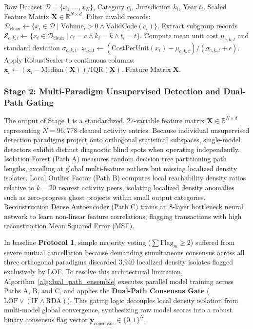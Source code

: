 \documentclass[runningheads]{llncs}
\begin{document}
\begin{algorithm}[htbp]
\caption{Year-Stratified Regional Baseline Centering and Scaling}
\label{alg:baseline_centering}
\begin{algorithmic}[1]
\REQUIRE Raw Dataset $\mathcal{D} = \{x_1, \dots, x_N\}$, Category $c_i$, Jurisdiction $k_i$, Year $t_i$.
\ENSURE Scaled Feature Matrix $\mathbf{X} \in \mathbb{R}^{N \times d}$.
\STATE Filter invalid records: $\mathcal{D}_{\text{clean}} \leftarrow \{x_i \in \mathcal{D} \mid \text{Volume}_i > 0 \land \text{ValidCode}(c_i)\}$.
    \STATE Extract subgroup records $\mathcal{S}_{c,k,t} \leftarrow \{x_i \in \mathcal{D}_{\text{clean}} \mid c_i = c \land k_i = k \land t_i = t\}$.
    \STATE Compute mean unit cost $\mu_{c,k,t}$ and standard deviation $\sigma_{c,k,t}$.
        \STATE $z_{i, \text{cat}} \leftarrow (\text{CostPerUnit}(x_i) - \mu_{c,k,t}) / (\sigma_{c,k,t} + \epsilon)$.
    \ENDFOR
\ENDFOR
\STATE Apply RobustScaler to continuous columns: $\mathbf{x}_i \leftarrow (\mathbf{x}_i - \text{Median}(\mathbf{X})) / \text{IQR}(\mathbf{X})$.
\RETURN Feature Matrix $\mathbf{X}$.
\end{algorithmic}
\end{algorithm}

\subsubsection{Stage 2: Multi-Paradigm Unsupervised Detection and Dual-Path Gating}
The output of Stage 1 is a standardized, 27-variable feature matrix $\mathbf{X} \in \mathbb{R}^{N \times d}$ representing $N=96,778$ cleaned activity entries. Because individual unsupervised detection paradigms project onto orthogonal statistical subspaces, single-model detectors exhibit distinct diagnostic blind spots when operating independently. Isolation Forest (Path A) measures random decision tree partitioning path lengths, excelling at global multi-feature outliers but missing localized density isolates. Local Outlier Factor (Path B) computes local reachability density ratios relative to $k=20$ nearest activity peers, isolating localized density anomalies such as zero-progress ghost projects within small output categories. Reconstruction Dense Autoencoder (Path C) trains an 8-layer bottleneck neural network to learn non-linear feature correlations, flagging transactions with high reconstruction Mean Squared Error (MSE).

In baseline \textbf{Protocol 1}, simple majority voting ($\sum \text{Flag}_m \ge 2$) suffered from severe mutual cancellation because demanding simultaneous consensus across all three orthogonal paradigms discarded 3,940 localized density isolates flagged exclusively by LOF. To resolve this architectural limitation, Algorithm~\ref{alg:dual_path_ensemble} executes parallel model training across Paths A, B, and C, and applies the \textbf{Dual-Path Consensus Gate} ($\text{LOF} \lor (\text{IF} \land \text{RDA})$). This gating logic decouples local density isolation from multi-model global convergence, synthesizing raw model scores into a robust binary consensus flag vector $\mathbf{y}_{\text{consensus}} \in \{0, 1\}^N$.
\end{document}
